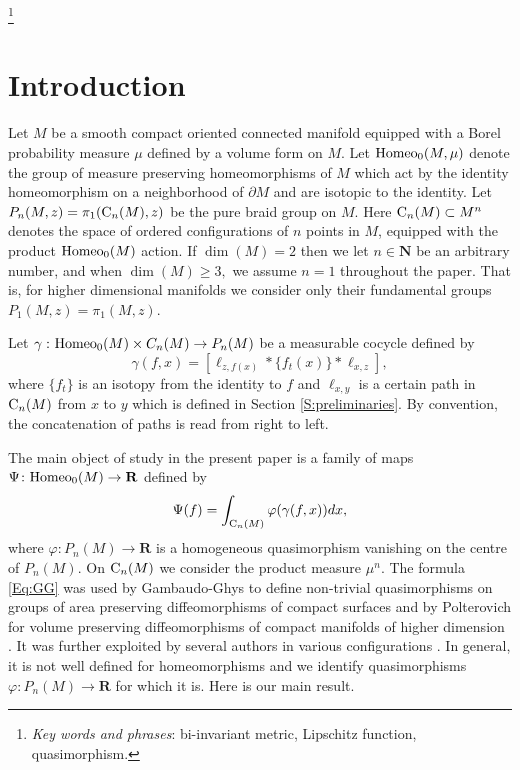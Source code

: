 \documentclass[11pt]{amsart}
\theoremstyle{definition}
\theoremstyle{remark}
\numberwithin{equation}{section}
\numberwithin{figure}{section}
\newcommand{\B}[1]{{\mathbf #1}}
\begin{document}
\footnote{\emph{Key words and phrases}: bi-invariant metric, Lipschitz function, quasimorphism.}

\renewcommand{\thefootnote}{\arabic{footnote}}
\setcounter{footnote}{0}

\fi

\section{Introduction}\label{S:intro}
Let $M$ be a smooth compact oriented connected manifold equipped with a  Borel probability 
measure $\mu$ defined by a volume form on $M$.
Let ${\rm Homeo}_0(M,\mu)$ denote the group of  
measure preserving homeomorphisms of $M$ which act by the  identity homeomorphism on a neighborhood of $\partial M$
and are isotopic to the identity. Let $P_n(M,z) = \pi_1({\rm C}_n(M),z)$ be the pure braid
group on $M$.  Here ${\rm C}_n(M) \subset M^n$ denotes the space of ordered
configurations of $n$ points in $M$, equipped with the product ${\rm Homeo}_0(M)$ action. 
If $\dim(M)=2$ then we let $n\in \B N$ be an
arbitrary number, and when $\dim(M)\geq 3,$ we assume $n=1$ throughout the paper. That is, for
higher dimensional manifolds we consider only their fundamental groups $P_1(M,z)=\pi_1(M,z)$.  

Let $\gamma\, \colon {\rm Homeo}_0(M)\times C_n(M)\to P_n(M)$ be a measurable cocycle defined by 
$$
\gamma(f,x) = \left[ \ell_{z,f(x)}*\{f_t(x)\}*\ell_{x,z} \right],
$$
where $\{f_t\}$ is an isotopy from the identity to $f$ and $\ell_{x,y}$ 
is a certain path in ${\rm C}_n(M)$ from $x$ to $y$ which is defined in
Section \ref{S:preliminaries}.  By convention, the concatenation of paths is
read from right to left.

The main object of study in the present paper is a family of maps
$\Psi\colon {\rm Homeo}_0(M)\to \B R$ defined by
\begin{equation}
\Psi(f) = \int_{{\rm C}_n(M)} \varphi(\gamma(f,x))dx,
\label{Eq:GG}
\end{equation}
where $\varphi\colon P_n(M)\to \B R$ is a homogeneous quasimorphism vanishing
on the centre of $P_n(M)$. On ${\rm C}_n(M)$ we consider the product measure $\mu^n$.  
The formula \eqref{Eq:GG} was used by
Gambaudo-Ghys to define non-trivial quasimorphisms on groups of area preserving
diffeomorphisms of compact surfaces \cite{zbMATH05019142} and by Polterovich for volume preserving 
diffeomorphisms of compact manifolds of higher dimension \cite{zbMATH05016104}. It was further exploited
by several authors in various configurations 
\cite{zbMATH06490154,zbMATH06160238,zbMATH06814502,zbMATH07159382,MR2253051}. In general, it is not
well defined for homeomorphisms and we identify quasimorphisms
$\varphi\colon P_n(M)\to \B R$ for which it is. Here is our main result.
\end{document}
